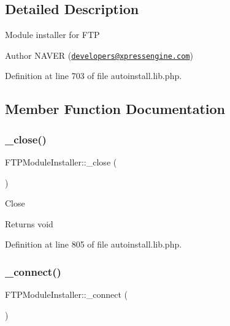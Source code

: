 \subsection{Detailed Description}
Module installer for F\+TP \begin{DoxyAuthor}{Author}
N\+A\+V\+ER (\href{mailto:developers@xpressengine.com}{\tt developers@xpressengine.\+com}) 
\end{DoxyAuthor}


Definition at line 703 of file autoinstall.\+lib.\+php.



\subsection{Member Function Documentation}
\mbox{\label{classFTPModuleInstaller_a283ea106c86af1ab83e97ae852d07f57}} 
\subsubsection{\texorpdfstring{\+\_\+close()}{\_close()}}
{\footnotesize\ttfamily F\+T\+P\+Module\+Installer\+::\+\_\+close (\begin{DoxyParamCaption}{ }\end{DoxyParamCaption})}

Close

\begin{DoxyReturn}{Returns}
void 
\end{DoxyReturn}


Definition at line 805 of file autoinstall.\+lib.\+php.

\mbox{\label{classFTPModuleInstaller_af6dd02408c44cc5e3903e7a8d195314b}} 
\subsubsection{\texorpdfstring{\+\_\+connect()}{\_connect()}}
{\footnotesize\ttfamily F\+T\+P\+Module\+Installer\+::\+\_\+connect (\begin{DoxyParamCaption}{ }\end{DoxyParamCaption})}

